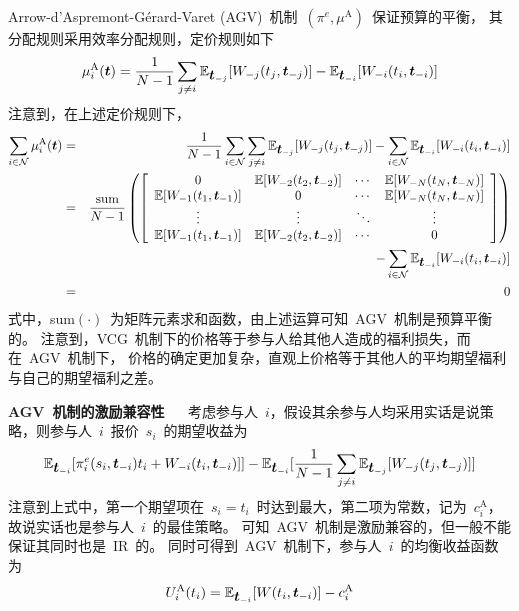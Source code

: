 \documentclass[a4paper,12pt]{article}
\newcommand{\mv}[1]{\mbox{\boldmath$#1$}}         %
\begin{document}
Arrow-d'Aspremont-G\'{e}rard-Varet (AGV)~机制~$(\pi^e, \mu^\mathrm{A})$~保证预算的平衡，
其分配规则采用效率分配规则，定价规则如下
\begin{equation}
    \mu_i^\mathrm{A}(\mv{t}) = \frac{1}{N-1} \sum_{j\neq i} \mathbb{E}_{\mv{t}_{-j}}[W_{-j}(t_j,\mv{t}_{-j})]
                             - \mathbb{E}_{\mv{t}_{-i}}[W_{-i}(t_i,\mv{t}_{-i})]
\end{equation}
注意到，在上述定价规则下，
\begin{eqnarray*}
    \sum_{i\in\mathcal{N}} \mu_i^\mathrm{A}(\mv{t}) &=& \frac{1}{N-1} \sum_{i\in\mathcal{N}}\sum_{j\neq i} \mathbb{E}_{\mv{t}_{-j}}[W_{-j}(t_j,\mv{t}_{-j})]
                             - \sum_{i\in\mathcal{N}} \mathbb{E}_{\mv{t}_{-i}}[W_{-i}(t_i,\mv{t}_{-i})] \\
			     &=& \frac{\mathrm{sum}}{N-1} \left(\left[
				 \begin{array}{cccc}
				     0 & \mathbb{E}[W_{-2}(t_2,\mv{t}_{-2})] & \cdots & \mathbb{E}[W_{-N}(t_N,\mv{t}_{-N})] \\
				     \mathbb{E}[W_{-1}(t_1,\mv{t}_{-1})] & 0 & \cdots & \mathbb{E}[W_{-N}(t_N,\mv{t}_{-N})] \\
				     \vdots & \vdots & \ddots & \vdots \\
				     \mathbb{E}[W_{-1}(t_1,\mv{t}_{-1})] & \mathbb{E}[W_{-2}(t_2,\mv{t}_{-2})] & \cdots & 0 
				 \end{array}
			         \right]\right) \\
			     & & - \sum_{i\in\mathcal{N}} \mathbb{E}_{\mv{t}_{-i}}[W_{-i}(t_i,\mv{t}_{-i})] \\
			     &=& 0
\end{eqnarray*}
式中，sum$(\cdot)$~为矩阵元素求和函数，由上述运算可知~AGV~机制是预算平衡的。
注意到，VCG~机制下的价格等于参与人给其他人造成的福利损失，而在~AGV~机制下，
价格的确定更加复杂，直观上价格等于其他人的平均期望福利与自己的期望福利之差。

\textbf{AGV~机制的激励兼容性}~ ~
考虑参与人~$i$，假设其余参与人均采用实话是说策略，则参与人~$i$~报价~$s_i$~的期望收益为
\begin{equation*}   
    \mathbb{E}_{\mv{t}_{-i}}[\pi^e_i(s_i,\mv{t}_{-i})t_i + W_{-i}(t_i,\mv{t}_{-i})]]
    - \mathbb{E}_{\mv{t}_{-i}}[\frac{1}{N-1} \sum_{j\neq i} \mathbb{E}_{\mv{t}_{-j}}[W_{-j}(t_j,\mv{t}_{-j})]]
\end{equation*}   
注意到上式中，第一个期望项在~$s_i = t_i$~时达到最大，第二项为常数，记为~$c_i^\mathrm{A}$，
故说实话也是参与人~$i$~的最佳策略。
可知~AGV~机制是激励兼容的，但一般不能保证其同时也是~IR~的。
同时可得到~AGV~机制下，参与人~$i$~的均衡收益函数为
\begin{equation}
    \label{AGV_payoff_equ}
    U_i^\mathrm{A}(t_i) = \mathbb{E}_{\mv{t}_{-i}}[W(t_i,\mv{t}_{-i})] - c_i^\mathrm{A}
\end{equation}   
\end{document}
